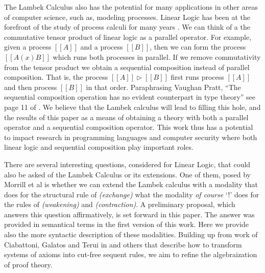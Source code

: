 \documentclass{lmcs}
\begin{document}
The Lambek Calculus also has the potential for many applications in
other areas of computer science, such as, modeling processes.  Linear
Logic has been at the forefront of the study of process calculi for
many years \cite{HONDA20102223,Pratt:1997,ABRAMSKY19945}. We can think
of a the commutative tensor product of linear logic as a parallel
operator.  For example, given a process $[[A]]$ and a process $[[B]]$,
then we can form the process $[[A (x) B]]$ which runs both processes
in parallel.  If we remove commutativity from the tensor product we
obtain a sequential composition instead of parallel composition.  That
is, the process $[[A]] \rhd [[B]]$ first runs process $[[A]]$ and then
process $[[B]]$ in that order.  Paraphrasing Vaughan Pratt, ``The
sequential composition operation has no evident counterpart in type
theory'' see page 11 of \cite{Pratt:1997}.  We believe that the Lambek
calculus will lead to filling this hole, and the results of this paper
as a means of obtaining a theory with both a parallel operator and a
sequential composition operator.  This work thus has a potential to
impact research in programming languages and computer security where
both linear logic and sequential composition play important roles.

There are several interesting questions, considered for Linear Logic,
that could also be asked of the Lambek Calculus or its extensions.
One of them, posed by Morrill et al is whether we can extend the
Lambek calculus with a modality that does for the structural rule of
\textit{(exchange)} what the modality \textit{of course} `!' does for
the rules of \textit{(weakening)} and \textit{(contraction)}.  A
preliminary proposal, which answers this question affirmatively, is
set forward in this paper. The answer was provided in semantical terms
in the first version of this work. Here we provide also the more
syntactic description of these modalities. Building up from work of
Ciabattoni, Galatos and Terui in \cite{Ciabattoni2012} and others that
describe how to transform systems of axioms into cut-free sequent
rules, we aim to refine the algebraization of proof theory.

\end{document}
